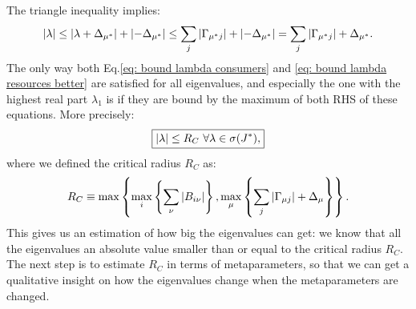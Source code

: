 \documentclass[12pt, titlepage]{report}
\begin{document}
The triangle inequality implies:
\begin{equation}
\left|{\lambda}\right| \leq \left|{\lambda+\Delta_{\mu^*}}\right|+\left|{-\Delta_{\mu^*}}\right| \leq \sum_j \left|{\Gamma_{\mu^* j}}\right| + \left|{-\Delta_{\mu^*}}\right| = \sum_j \left|{\Gamma_{\mu^* j}}\right| + \Delta_{\mu^*}.\label{eq: bound lambda resources better}
\end{equation}
The only way both Eq.\eqref{eq: bound lambda consumers} and \eqref{eq: bound lambda resources better} are satisfied for all eigenvalues, and especially the one with the highest real part $\lambda_1$ is if they are bound by the maximum of both RHS of these equations. More precisely:
\begin{equation}
\boxed{
\left|{\lambda}\right| \leq R_C \ \forall \lambda \in \sigma(J^*), \label{eq: overall bound on lambda}
}
\end{equation}
where we defined the critical radius $R_C$ as:
\begin{equation}
R_C \equiv \max\left\{\max_i\left\{\sum_\nu \left|{B_{i\nu}}\right|\right\}, \max_\mu\left\{\sum_j \left|{\Gamma_{\mu j}}\right|+\Delta_\mu\right\}\right\}.
\end{equation}
This gives us an estimation of how big the eigenvalues can get: we know that all the eigenvalues  an absolute value smaller than or equal to the critical radius $R_C$.
The next step is to estimate $R_C$ in terms of metaparameters, so that we can get a qualitative insight on how the eigenvalues change when the metaparameters are changed.
\end{document}
